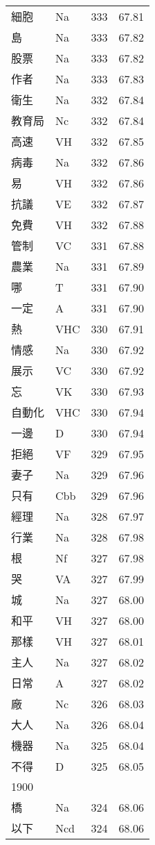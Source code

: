 \documentclass[twocolumn]{book}
\begin{document}
\begin{supertabular}{llrr}
細胞 & Na & 333 &  67.81\\
島 & Na & 333 &  67.82\\
股票 & Na & 333 &  67.82\\
作者 & Na & 333 &  67.83\\
衛生 & Na & 332 &  67.84\\
教育局 & Nc & 332 &  67.84\\
高速 & VH & 332 &  67.85\\
病毒 & Na & 332 &  67.86\\
易 & VH & 332 &  67.86\\
抗議 & VE & 332 &  67.87\\
免費 & VH & 332 &  67.88\\
管制 & VC & 331 &  67.88\\
農業 & Na & 331 &  67.89\\
哪 & T & 331 &  67.90\\
一定 & A & 331 &  67.90\\
熱 & VHC & 330 &  67.91\\
情感 & Na & 330 &  67.92\\
展示 & VC & 330 &  67.92\\
忘 & VK & 330 &  67.93\\
自動化 & VHC & 330 &  67.94\\
一邊 & D & 330 &  67.94\\
拒絕 & VF & 329 &  67.95\\
妻子 & Na & 329 &  67.96\\
只有 & Cbb & 329 &  67.96\\
經理 & Na & 328 &  67.97\\
行業 & Na & 328 &  67.98\\
根 & Nf & 327 &  67.98\\
哭 & VA & 327 &  67.99\\
城 & Na & 327 &  68.00\\
和平 & VH & 327 &  68.00\\
那樣 & VH & 327 &  68.01\\
主人 & Na & 327 &  68.02\\
日常 & A & 327 &  68.02\\
廠 & Nc & 326 &  68.03\\
大人 & Na & 326 &  68.04\\
機器 & Na & 325 &  68.04\\
不得 & D & 325 &  68.05\\
1900\\
橋 & Na & 324 &  68.06\\
以下 & Ncd & 324 &  68.06\\

\end{supertabular}
\end{document}
